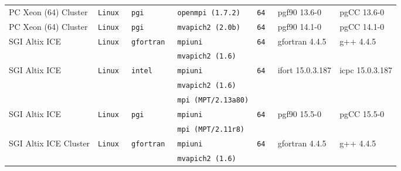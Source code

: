 \begin{longtable}{lllllll}
PC Xeon (64) Cluster  &\tt Linux  &\tt pgi          &\tt openmpi (1.7.2)  &\tt 64           & pgf90 \footnotesize 13.6-0          & pgCC \footnotesize 13.6-0       \\ %
PC Xeon (64) Cluster  &\tt Linux  &\tt pgi          &\tt mvapich2 (2.0b)  &\tt 64           & pgf90 \footnotesize 14.1-0          & pgCC \footnotesize 14.1-0       \\ %
SGI Altix ICE         &\tt Linux  &\tt gfortran     &\tt mpiuni           &\tt 64           & gfortran \footnotesize 4.4.5        & g++ \footnotesize 4.4.5         \\ %
                      &           &                 &\tt mvapich2 (1.6)   &                 &                                     &                                 \\
SGI Altix ICE         &\tt Linux  &\tt intel        &\tt mpiuni           &\tt 64           & ifort \footnotesize 15.0.3.187      & icpc \footnotesize 15.0.3.187   \\ %
                      &           &                 &\tt mvapich2 (1.6)   &                 &                                     &                                 \\
                      &           &                 &\tt mpi (MPT/2.13a80)&                 &                                     &                                 \\
SGI Altix ICE         &\tt Linux  &\tt pgi          &\tt mpiuni           &\tt 64           & pgf90 \footnotesize 15.5-0          & pgCC \footnotesize 15.5-0       \\ %
                      &           &                 &\tt mpi (MPT/2.11r8) &                 &                                     &                                 \\
SGI Altix ICE Cluster &\tt Linux  &\tt gfortran     &\tt mpiuni           &\tt 64           & gfortran \footnotesize 4.4.5        & g++ \footnotesize 4.4.5         \\ %
                      &           &                 &\tt mvapich2 (1.6)   &                 &                                     &                                 \\

\end{longtable}
